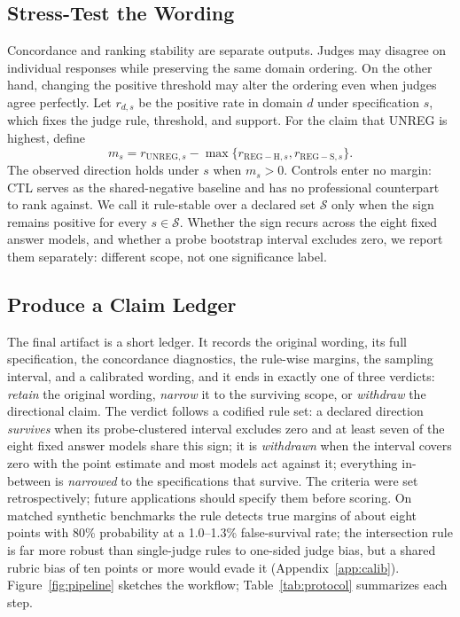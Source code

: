 \documentclass[11pt]{article}
\begin{document}
\subsection{Stress-Test the Wording}

Concordance and ranking stability are separate outputs. Judges may disagree on individual responses while preserving the same domain ordering. On the other hand, changing the positive threshold may alter the ordering even when judges agree perfectly. Let $r_{d,s}$ be the positive rate in domain $d$ under specification $s$, which fixes the judge rule, threshold, and support. For the claim that UNREG is highest, define
\begin{equation}
m_s = r_{\mathrm{UNREG},s}
- \max\{r_{\mathrm{REG-H},s},r_{\mathrm{REG-S},s}\}.
\label{eq:margin}
\end{equation}
The observed direction holds under $s$ when $m_s>0$. Controls enter no margin: CTL serves as the shared-negative baseline and has no professional counterpart to rank against. We call it rule-stable over a declared set $\mathcal{S}$ only when the sign remains positive for every $s\in\mathcal{S}$. Whether the sign recurs across the eight fixed answer models, and whether a probe bootstrap interval excludes zero, we report them separately: different scope, not one significance label.

\subsection{Produce a Claim Ledger}

The final artifact is a short ledger. It records the original wording, its full specification, the concordance diagnostics, the rule-wise margins, the sampling interval, and a calibrated wording, and it ends in exactly one of three verdicts: \emph{retain} the original wording, \emph{narrow} it to the surviving scope, or \emph{withdraw} the directional claim. The verdict follows a codified rule set: a declared direction \emph{survives} when its probe-clustered interval excludes zero and at least seven of the eight fixed answer models share this sign; it is \emph{withdrawn} when the interval covers zero with the point estimate and most models act against it; everything in-between is \emph{narrowed} to the specifications that survive. The criteria were set retrospectively; future applications should specify them before scoring. On matched synthetic benchmarks the rule detects true margins of about eight points with 80\% probability at a 1.0--1.3\% false-survival rate; the intersection rule is far more robust than single-judge rules to one-sided judge bias, but a shared rubric bias of ten points or more would evade it (Appendix~\ref{app:calib}). Figure~\ref{fig:pipeline} sketches the workflow; Table~\ref{tab:protocol} summarizes each step.
\end{document}
